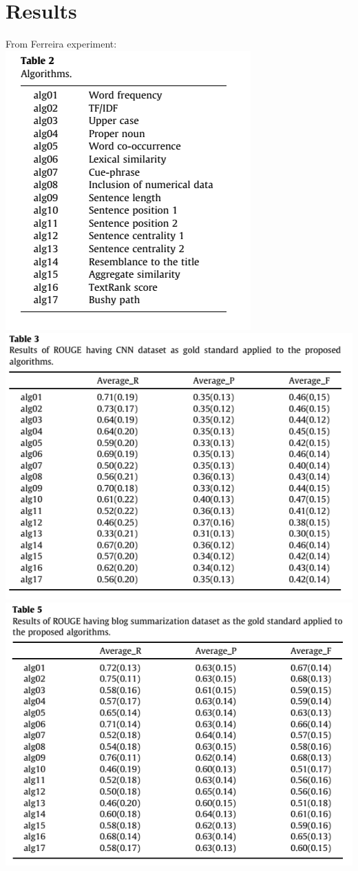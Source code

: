 \documentclass[conference]{IEEEtran}
\begin{document}
\section{Results}
From Ferreira experiment:\\
\includegraphics[scale=.6]{algs}
\includegraphics[scale=.5]{cnn1}
\includegraphics[scale=.5]{blg1}
\end{document}
